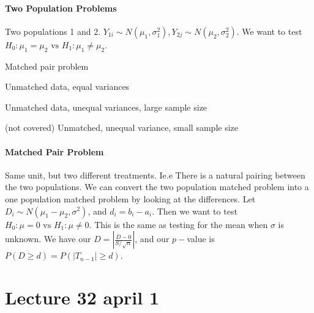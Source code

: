\documentclass[10pt,letter]{article}
\theoremstyle{plain}
\theoremstyle{definition}
\begin{document}
\paragraph{Two Population Problems}
Two populations 1 and 2. $Y_{1i}\sim N(\mu_1,\sigma_1^2),Y_{2j}\sim N(\mu_2,\sigma_2^2)$. We want to test $H_0:\mu_1=\mu_2\text{ vs }H_1:\mu_1\neq\mu_2$. \begin{casesa}
    \item Matched pair problem 
    \item Unmatched data, equal variances 
    \item Unmatched data, unequal variances, large sample size
    \item (not covered) Unmatched, unequal variance, small sample size 
\end{casesa}
\paragraph{Matched Pair Problem}
Same unit, but two different treatments. Ie.e There is a natural pairing between the two populations. We can convert the two population matched problem into a one population matched problem by looking at the differences. Let $D_i\sim N(\mu_1-\mu_2,\sigma^2)$, and $d_i=b_i-a_i$. Then we want to test $H_0:\mu=0\text{ vs }H_1:\mu\neq0$. This is the same as testing for the mean when $\sigma$ is unknown. We have our $D=\left|\frac{\bar{D}-0}{S/\sqrt{n}}\right|$, and our $p-$value is $P(D\geq d)=P(|T_{n-1}|\geq d)$. 

\section*{Lecture 32 april 1}
\end{document}
